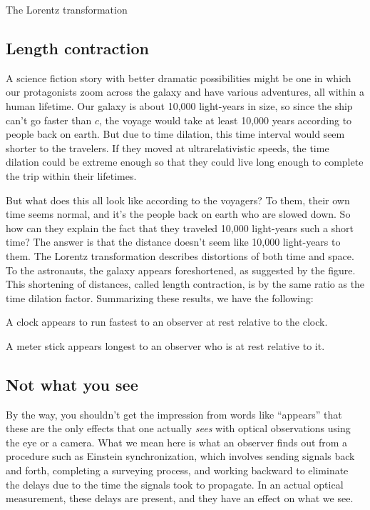 \begin{section}{The Lorentz transformation}
\section{Length contraction}

A science fiction story with better dramatic possibilities might be one in which our protagonists zoom across the
galaxy and have various adventures, all within a human lifetime. Our galaxy is about 10,000 light-years in size,
so since the ship can't go faster than $c$, the voyage would take at least 10,000 years according to people back
on earth. But due to time dilation, this time interval would seem shorter to the travelers. If they moved
at ultrarelativistic speeds, the time dilation could be extreme enough so that they could
live long enough to complete the trip within their lifetimes.


But what does this all look like according to the voyagers? To them, their own time seems normal, and it's the
people back on earth who are slowed down. So how can they explain the fact that they traveled 10,000 light-years
such a short time? The answer is that the distance doesn't seem like 10,000 light-years to them.
The Lorentz transformation describes distortions of both time and space. To the astronauts, the galaxy appears
foreshortened, as suggested by the figure. This shortening of distances, called length contraction, is by the
same ratio as the time dilation factor. Summarizing these results, we have the following:

\begin{important}
A clock appears to run fastest to an observer at rest relative to  the clock.
\end{important}

\begin{important}
A meter stick appears longest to an observer who is at rest relative to it.
\end{important}


\section{Not what you see}

By the way, you shouldn't get the impression from words like ``appears'' that these are the only effects that
one actually \emph{sees} with optical observations using the eye or a camera. What we mean here is what an
observer finds out from a procedure such as Einstein synchronization, which involves
sending signals back and forth, completing a surveying process, and working backward to eliminate the
delays due to the time the signals took to propagate. In an actual optical measurement, these delays
are present, and they have an effect on what we see.


\end{section}
